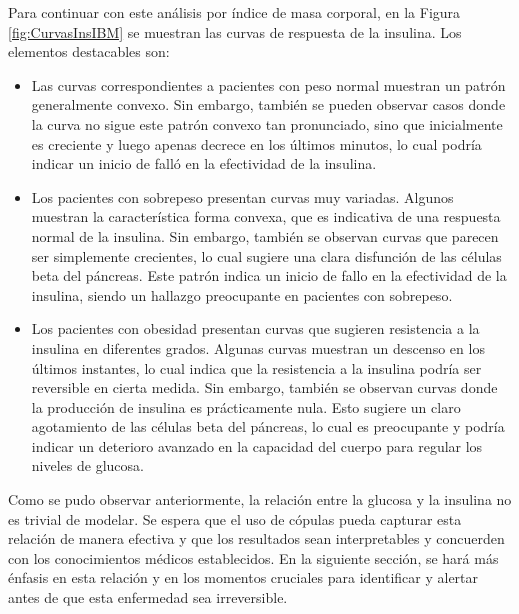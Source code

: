 Para continuar con este análisis por índice de masa corporal, en la Figura \ref{fig:CurvasInsIBM} se muestran las curvas de respuesta de la insulina. Los elementos destacables son:

\begin{itemize}
    \item  Las curvas correspondientes a pacientes con peso normal muestran un patrón generalmente convexo. Sin embargo, también se pueden observar casos donde la curva no sigue este patrón convexo tan pronunciado, sino que inicialmente es creciente y luego apenas decrece en los últimos minutos, lo cual podría indicar un inicio de falló en la efectividad de la insulina.

    \item Los pacientes con sobrepeso presentan curvas muy variadas. Algunos muestran la característica forma convexa, que es indicativa de una respuesta normal de la insulina. Sin embargo, también se observan curvas que parecen ser simplemente crecientes, lo cual sugiere una clara disfunción de las células beta del páncreas. Este patrón indica un inicio de fallo en la efectividad de la insulina, siendo un hallazgo preocupante en pacientes con sobrepeso.

    \item Los pacientes con obesidad presentan curvas que sugieren resistencia a la insulina en diferentes grados. Algunas curvas muestran un descenso en los últimos instantes, lo cual indica que la resistencia a la insulina podría ser reversible en cierta medida. Sin embargo, también se observan curvas donde la producción de insulina es prácticamente nula. Esto sugiere un claro agotamiento de las células beta del páncreas, lo cual es preocupante y podría indicar un deterioro avanzado en la capacidad del cuerpo para regular los niveles de glucosa.
    \end{itemize}

Como se pudo observar anteriormente, la relación entre la glucosa y la insulina no es trivial de modelar. Se espera que el uso de cópulas pueda capturar esta relación de manera efectiva y que los resultados sean interpretables y concuerden con los conocimientos médicos establecidos. En la siguiente sección, se hará más énfasis en esta relación y en los momentos cruciales para identificar y alertar antes de que esta enfermedad sea irreversible.


